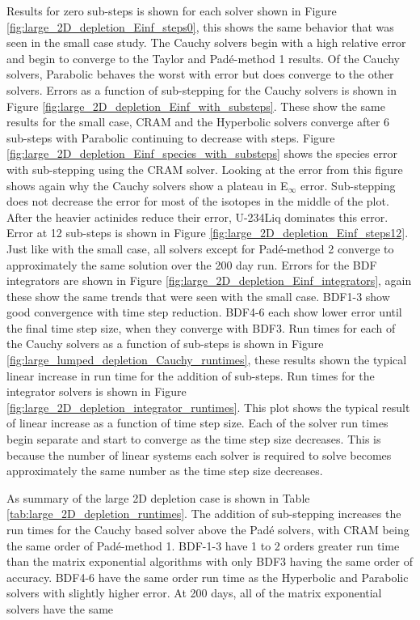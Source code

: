 Results for zero sub-steps is shown for each solver shown in Figure \ref{fig:large_2D_depletion_Einf_steps0}, this shows the same behavior that was seen in the small case study. The Cauchy solvers begin with a high relative error and begin to converge to the Taylor and Pad\'e-method 1 results. Of the Cauchy solvers, Parabolic behaves the worst with error but does converge to the other solvers. Errors as a function of sub-stepping for the Cauchy solvers is shown in Figure \ref{fig:large_2D_depletion_Einf_with_substeps}. These show the same results for the small case, CRAM and the Hyperbolic solvers converge after 6 sub-steps with Parabolic continuing to decrease with steps. Figure \ref{fig:large_2D_depletion_Einf_species_with_substeps} shows the species error with sub-stepping using the CRAM solver. Looking at the error from this figure shows again why the Cauchy solvers show a plateau in E${}_{\infty}$ error. Sub-stepping does not decrease the error for most of the isotopes in the middle of the plot. After the heavier actinides reduce their error, U-234Liq dominates this error. Error at 12 sub-steps is shown in Figure \ref{fig:large_2D_depletion_Einf_steps12}. Just like with the small case, all solvers except for Pad\'e-method 2 converge to approximately the same solution over the 200 day run. Errors for the BDF integrators are shown in Figure \ref{fig:large_2D_depletion_Einf_integrators}, again these show the same trends that were seen with the small case. BDF1-3 show good convergence with time step reduction. BDF4-6 each show lower error until the final time step size, when they converge with BDF3. Run times for each of the Cauchy solvers as a function of sub-steps is shown in Figure \ref{fig:large_lumped_depletion_Cauchy_runtimes}, these results shown the typical linear increase in run time for the addition of sub-steps. Run times for the integrator solvers is shown in Figure \ref{fig:large_2D_depletion_integrator_runtimes}. This plot shows the typical result of linear increase as a function of time step size. Each of the solver run times begin separate and start to converge as the time step size decreases. This is because the number of linear systems each solver is required to solve becomes approximately the same number as the time step size decreases. 

As summary of the large 2D depletion case is shown in Table \ref{tab:large_2D_depletion_runtimes}. The addition of sub-stepping increases the run times for the Cauchy based solver above the Pad\'e solvers, with CRAM being the same order of Pad\'e-method 1. BDF-1-3 have 1 to 2 orders greater run time than the matrix exponential algorithms with only BDF3 having the same order of accuracy. BDF4-6 have the same order run time as the Hyperbolic and Parabolic solvers with slightly higher error. At 200 days, all of the matrix exponential solvers have the same 

